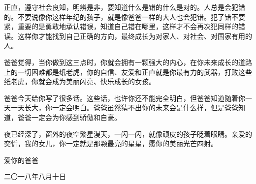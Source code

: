 正直，遵守社会良知，明辨是非，要知道什么是错的什么是对的。人总是会犯错的。不要说像你这样年纪的孩子，就是像爸爸一样的大人也会犯错。犯了错不要紧，重要的是勇敢地承认错误，知道自己错在哪里，这样才不会再次犯同样的错误。这样你才能找到自己正确的方向，最终成长为对家人、对社会、对国家有用的人。

爸爸觉得，当你做到这三点时，你就会拥有一颗强大的内心，在你未来成长的道路上的一切困难都是纸老虎，你的自信、友爱和正直就是你最有力的武器，打败这些纸老虎，你就会成为美丽闪亮、快乐成长的女孩。

爸爸今天给你写了很多话。这些话，也许你还不能完全明白，但爸爸知道随着你一天一天长大，你一定会明白。爸爸虽然猜不出你的未来会是什么样，但是爸爸知道，爸爸一定会为你感到骄傲和自豪。

夜已经深了，窗外的夜空繁星漫天，一闪一闪，就像顽皮的孩子眨着眼睛。亲爱的奕忻，我的女儿，你一定就是那颗最亮的星星，愿你的美丽光芒四射。

\mbox{}

\leftskip=60mm 爱你的爸爸

\leftskip=53mm 二〇一八年八月十日